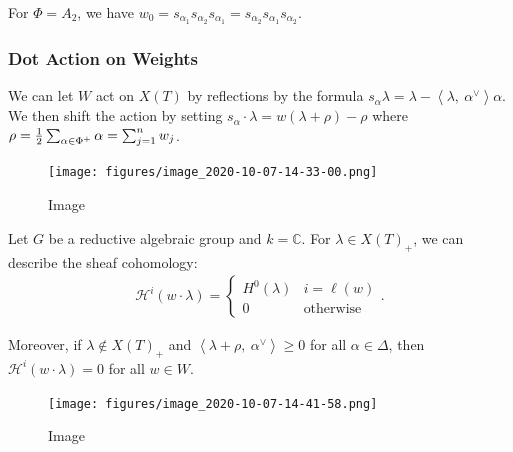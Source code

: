 \begin{example}

\begin{example}

For \(\Phi = A_2\), we have
\(w_0 = s_{\alpha_1} s_{\alpha_2} s_{\alpha_1} = s_{\alpha_2} s_{\alpha_1} s_{\alpha_2}\).

\end{example}

\end{example}

\hypertarget{dot-action-on-weights}{%
\subsubsection{Dot Action on Weights}\label{dot-action-on-weights}}

We can let \(W\) act on \(X(T)\) by reflections by the formula
\(s_\alpha \lambda = \lambda - {\left\langle {\lambda},~{\alpha^\vee} \right\rangle}\alpha\).
We then shift the action by setting
\(s_\alpha \cdot \lambda = w(\lambda+\rho)-\rho\) where
\(\rho = {1\over 2} \sum_{\alpha\in \Phi^+} \alpha = \sum_{j=1}^n w_j\).

\begin{figure}
\centering
\texttt{[image: figures/image\_2020-10-07-14-33-00.png]}
\caption{Image}
\end{figure}

\begin{theorem}

\begin{theorem}

Let \(G\) be a reductive algebraic group and \(k={\mathbb{C}}\). For
\(\lambda \in X(T)_+\), we can describe the sheaf cohomology:
\begin{align*}   \mathcal{H}^i(w\cdot \lambda) = \begin{cases} H^0(\lambda) & i=\ell(w) \\ 0 & \text{otherwise} \end{cases} .\end{align*}

Moreover, if \(\lambda \not\in X(T)_+\) and
\({\left\langle {\lambda+\rho},~{\alpha^\vee} \right\rangle} \geq 0\)
for all \(\alpha \in \Delta\), then
\(\mathcal{H}^i(w\cdot \lambda) = 0\) for all \(w\in W\).

\begin{figure}
\centering
\texttt{[image: figures/image\_2020-10-07-14-41-58.png]}
\caption{Image}
\end{figure}

\end{theorem}

\end{theorem}

